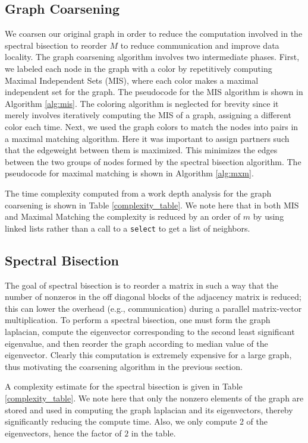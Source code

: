 \documentclass[11pt]{article}
\begin{document}
\subsection{Graph Coarsening}

We coarsen our original graph in order to reduce the computation involved in
the spectral bisection to reorder $M$ to reduce communication and improve data
locality.
The graph coarsening algorithm involves two intermediate phases. First, we
labeled each node in the graph with a color by repetitively computing Maximal
Independent Sets (MIS), where each color makes a maximal independent set for the
graph. The pseudocode for the MIS algorithm is shown in
Algorithm \ref{alg:mis}. The coloring algorithm is neglected for brevity since
it merely involves iteratively computing the MIS of a graph, assigning a
different color each time. Next, we used the
graph colors to match the nodes into pairs in a maximal matching algorithm. Here
it was important to assign partners such that the edgeweight between them is
maximized. This minimizes the edges between the two groups of nodes formed
by the spectral bisection algorithm. The pseudocode for maximal matching is
shown in Algorithm \ref{alg:mxm}. 

The time complexity computed from a work depth analysis for the graph coarsening is shown in Table
\ref{complexity_table}. We note here that in both MIS and Maximal Matching the
complexity is reduced by an order of $m$ by using linked lists rather than
a call to a \texttt{select} to get a list of neighbors. 

\subsection{Spectral Bisection}

The goal of spectral bisection is to reorder a matrix in such a way that the
number of nonzeros in the off diagonal blocks of the adjacency matrix is
reduced; this can lower the overhead (e.g., communication) during a parallel
matrix-vector multiplication. To perform a spectral bisection, one must form the
graph laplacian, compute the eigenvector corresponding to the second least significant
eigenvalue, and then reorder the graph according to median value of the
eigenvector. Clearly this computation is extremely expensive for a large
graph, thus motivating the coarsening algorithm in the previous section. 

A complexity estimate for the spectral bisection is given in Table
\ref{complexity_table}. We note here that only the nonzero elements of the graph
are stored and used in computing the graph laplacian and its eigenvectors, thereby significantly
reducing the compute time. Also, we only compute 2 of the eigenvectors, hence
the factor of $2$ in the table. 
\end{document}
